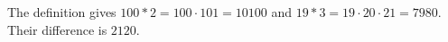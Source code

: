 The definition gives $100*2=100\cdot101=10100$ and $19*3=19\cdot20\cdot21=7980$. Their difference is $\boxed{2120}$.
